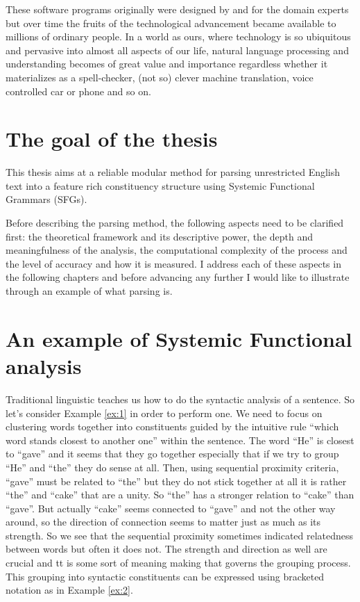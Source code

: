 These software programs originally were designed by and for the domain experts but over time the fruits of the technological advancement became available to millions of ordinary people. In a world as ours, where technology is so ubiquitous and pervasive into almost all aspects of our life, natural language processing and understanding becomes of great value and importance regardless whether it materializes as a spell-checker, (not so) clever machine translation, voice controlled car or phone and so on. 

\section{The goal of the thesis}
This thesis aims at a reliable modular method for parsing unrestricted English text into a feature rich constituency structure using Systemic Functional Grammars (SFGs).

Before describing the parsing method, the following aspects need to be clarified first: the theoretical framework and its descriptive power, the depth and meaningfulness of the analysis, the computational complexity of the process and the level of accuracy and how it is measured. I address each of these aspects in the following chapters and before advancing any further I would like to illustrate through an example of what parsing is. 

\section{An example of Systemic Functional analysis}
Traditional linguistic teaches us how to do the syntactic analysis of a sentence. So let's consider Example \ref{ex:1} in order to perform one. We need to focus on clustering words together into constituents guided by the intuitive rule ``which word stands closest to another one'' within the sentence. The word ``He'' is closest to ``gave'' and it seems that they go together especially that if we try to group ``He'' and ``the'' they do  sense at all. Then, using sequential proximity criteria, ``gave'' must be related to ``the'' but they do not stick together at all it is rather ``the'' and ``cake'' that are a unity. So ``the'' has a stronger relation to ``cake'' than ``gave''. But actually ``cake'' seems connected to ``gave'' and not the other way around, so the direction of connection seems to matter just as much as its strength. So we see that the sequential proximity sometimes indicated relatedness between words but often it does not. The strength and direction as well are crucial and tt is some sort of meaning making that governs the grouping process. This grouping into syntactic constituents can be expressed using bracketed notation as in Example \ref{ex:2}.

